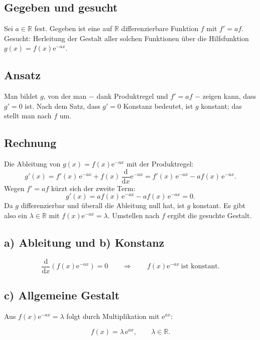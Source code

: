 
\subsection*{Gegeben und gesucht}
Sei $a\in\mathbb R$ fest. Gegeben ist eine auf $\mathbb R$ differenzierbare
Funktion $f$ mit $f'=af$. Gesucht: Herleitung der Gestalt aller solchen
Funktionen über die Hilfsfunktion $g(x)=f(x)\mathrm e^{-ax}$.

\subsection*{Ansatz}
Man bildet $g$, von der man − dank Produktregel und $f'=af$ − zeigen kann,
dass $g'=0$ ist. Nach dem Satz, dass $g'=0$ Konstanz bedeutet, ist $g$
konstant; das stellt man nach $f$ um.

\subsection*{Rechnung}
Die Ableitung von $g(x)=f(x)\mathrm e^{-ax}$ mit der Produktregel:
\begin{equation}
  g'(x)=f'(x)\,\mathrm e^{-ax}+f(x)\,\frac{\mathrm d}{\mathrm dx}\mathrm e^{-ax}
  = f'(x)\,\mathrm e^{-ax}-a f(x)\,\mathrm e^{-ax}.
\end{equation}
Wegen $f'=af$ kürzt sich der zweite Term:
\begin{equation}
  g'(x)=a f(x)\,\mathrm e^{-ax}-a f(x)\,\mathrm e^{-ax}=0.
\end{equation}
Da $g$ differenzierbar und überall die Ableitung null hat, ist $g$ konstant.
Es gibt also ein $\lambda\in\mathbb R$ mit $f(x)\mathrm e^{-ax}=\lambda$.
Umstellen nach $f$ ergibt die gesuchte Gestalt.

\subsection*{a) Ableitung und b) Konstanz}
\begin{ergebnis}
\begin{equation*}
  \frac{\mathrm d}{\mathrm dx}\left(f(x)\mathrm e^{-ax}\right)=0
  \qquad\Rightarrow\qquad
  f(x)\mathrm e^{-ax}\ \text{ist konstant}.
\end{equation*}
\end{ergebnis}

\subsection*{c) Allgemeine Gestalt}
Aus $f(x)\mathrm e^{-ax}=\lambda$ folgt durch Multiplikation mit $\mathrm e^{ax}$:
\begin{ergebnis}
\begin{equation*}
  f(x)=\lambda\,\mathrm e^{ax},\qquad \lambda\in\mathbb R.
\end{equation*}
\end{ergebnis}

